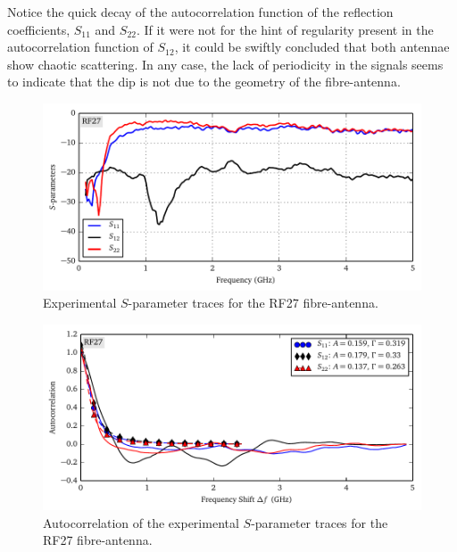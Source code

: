 Notice the quick decay of the autocorrelation function of the reflection 
coefficients, $S_{11}$ and $S_{22}$. If it were not for the hint of
regularity present in the autocorrelation function of $S_{12}$, 
it could be swiftly concluded that both antennae show chaotic scattering.
In any case, the lack of periodicity in the signals seems to indicate 
that the dip is not due to the geometry of the fibre-antenna. 

\begin{figure}
 \centering
 \includegraphics{figs/active/RF27-sParameters.pdf}
 \caption[Experimental $S$-parameter traces for the RF27 fibre-antenna]
 		{Experimental $S$-parameter traces for the RF27 fibre-antenna.}
 \label{fig:active.lcx.rf27sParameters}
\end{figure}

\begin{figure}
 \centering
 \includegraphics{figs/active/RF27-autoCorrelation.pdf}
 \caption[Autocorrelation of the experimental $S$-parameter traces for the RF27 fibre-antenna]
 		{Autocorrelation of the experimental $S$-parameter traces for the RF27 fibre-antenna.}
 \label{fig:active.lcx.rf27autocorrelation}
\end{figure}


